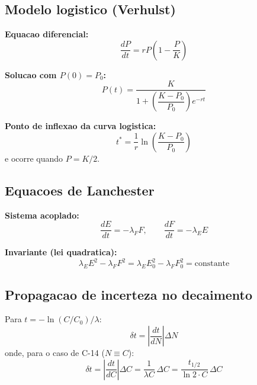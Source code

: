 \documentclass[12pt,a4paper]{article}
\begin{document}
\subsection*{Modelo logistico (Verhulst)}

\textbf{Equacao diferencial:}
\begin{equation}
\frac{dP}{dt} = rP\left(1-\frac{P}{K}\right)
\end{equation}

\textbf{Solucao com $P(0)=P_0$:}
\begin{equation}
P(t) = \frac{K}{1 + \left(\dfrac{K-P_0}{P_0}\right)e^{-rt}}
\end{equation}

\textbf{Ponto de inflexao da curva logistica:}
\begin{equation}
t^* = \frac{1}{r}\ln\left(\frac{K-P_0}{P_0}\right)
\end{equation}
e ocorre quando $P=K/2$.

\subsection*{Equacoes de Lanchester}

\textbf{Sistema acoplado:}
\begin{equation}
\frac{dE}{dt} = -\lambda_F F,
\qquad
\frac{dF}{dt} = -\lambda_E E
\end{equation}

\textbf{Invariante (lei quadratica):}
\begin{equation}
\lambda_E E^2 - \lambda_F F^2 = \lambda_E E_0^2 - \lambda_F F_0^2 = \text{constante}
\end{equation}

\subsection*{Propagacao de incerteza no decaimento}

Para $t = -\ln(C/C_0)/\lambda$:
\begin{equation}
\delta t = \left|\frac{dt}{dN}\right|\Delta N
\end{equation}
onde, para o caso de C-14 ($N\equiv C$):
\begin{equation}
\delta t = \left|\frac{dt}{dC}\right|\Delta C
= \frac{1}{\lambda C}\,\Delta C
= \frac{t_{1/2}}{\ln 2\cdot C}\,\Delta C
\end{equation}
\end{document}

